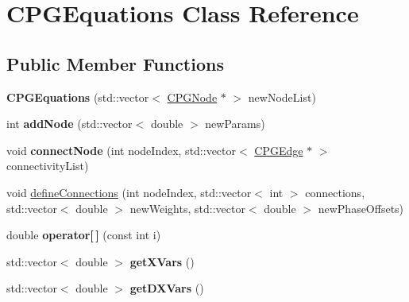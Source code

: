 \hypertarget{class_c_p_g_equations}{\section{C\-P\-G\-Equations Class Reference}
\label{class_c_p_g_equations}
}
\subsection*{Public Member Functions}
\begin{DoxyCompactItemize}
\item 
\hypertarget{class_c_p_g_equations_a91894300fac8245f4c185a19a6c42176}{{\bfseries C\-P\-G\-Equations} (std\-::vector$<$ \hyperlink{class_c_p_g_node}{C\-P\-G\-Node} $\ast$ $>$ new\-Node\-List)}\label{class_c_p_g_equations_a91894300fac8245f4c185a19a6c42176}

\item 
\hypertarget{class_c_p_g_equations_a2d724bd5a867dd6e202afe34680ea26b}{int {\bfseries add\-Node} (std\-::vector$<$ double $>$ new\-Params)}\label{class_c_p_g_equations_a2d724bd5a867dd6e202afe34680ea26b}

\item 
\hypertarget{class_c_p_g_equations_af008076a9584c65a89f586d5c59bc370}{void {\bfseries connect\-Node} (int node\-Index, std\-::vector$<$ \hyperlink{class_c_p_g_edge}{C\-P\-G\-Edge} $\ast$ $>$ connectivity\-List)}\label{class_c_p_g_equations_af008076a9584c65a89f586d5c59bc370}

\item 
void \hyperlink{class_c_p_g_equations_a99b42aef759c8915005352aba8ff6fbe}{define\-Connections} (int node\-Index, std\-::vector$<$ int $>$ connections, std\-::vector$<$ double $>$ new\-Weights, std\-::vector$<$ double $>$ new\-Phase\-Offsets)
\item 
\hypertarget{class_c_p_g_equations_a3a7055db8095917c6b4deffa626bddaf}{double {\bfseries operator\mbox{[}$\,$\mbox{]}} (const int i)}\label{class_c_p_g_equations_a3a7055db8095917c6b4deffa626bddaf}

\item 
\hypertarget{class_c_p_g_equations_a39550b37367581eca191f43a52ab7161}{std\-::vector$<$ double $>$ {\bfseries get\-X\-Vars} ()}\label{class_c_p_g_equations_a39550b37367581eca191f43a52ab7161}

\item 
\hypertarget{class_c_p_g_equations_ac4dfb1d7b35a433bf4d0183fd8e78f68}{std\-::vector$<$ double $>$ {\bfseries get\-D\-X\-Vars} ()}\label{class_c_p_g_equations_ac4dfb1d7b35a433bf4d0183fd8e78f68}


\end{DoxyCompactItemize}
